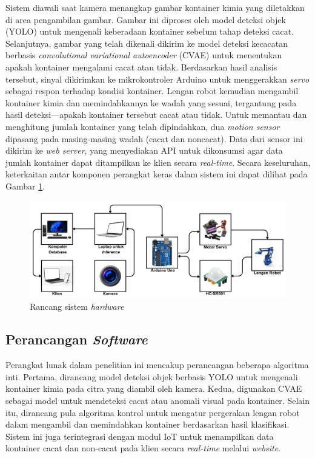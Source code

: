 Sistem diawali saat kamera menangkap gambar kontainer kimia yang
diletakkan di area pengambilan gambar. Gambar ini diproses oleh model
deteksi objek (YOLO) untuk mengenali keberadaan kontainer sebelum
tahap deteksi cacat. Selanjutnya, gambar yang telah dikenali dikirim
ke model deteksi kecacatan berbasis \textit{convolutional variational
autoencoder} (CVAE) untuk
menentukan apakah kontainer mengalami cacat atau tidak. Berdasarkan
hasil analisis tersebut, sinyal dikirimkan ke mikrokontroler Arduino
untuk menggerakkan \textit{servo} sebagai respon terhadap kondisi kontainer.
Lengan robot kemudian mengambil kontainer kimia dan memindahkannya ke
wadah yang sesuai, tergantung pada hasil deteksi—apakah kontainer
tersebut cacat atau tidak. Untuk memantau dan menghitung jumlah
kontainer yang telah dipindahkan, dua \textit{motion sensor} dipasang pada
masing-masing wadah (cacat dan noncacat). Data dari sensor ini
dikirim ke \textit{web server}, yang menyediakan API untuk dikonsumsi agar
data jumlah kontainer dapat ditampilkan ke klien secara \textit{real-time}.
Secara keseluruhan, keterkaitan antar komponen perangkat keras dalam
sistem ini dapat dilihat pada Gambar \ref{fig:hardware}.

\begin{figure}[H]
  \centering
  \includegraphics[width=\textwidth]{gambar/rancang.png}
  \caption{Rancang sistem \textit{hardware}}
  \label{fig:hardware}
\end{figure}
\vspace{-1em}

\vspace{1em}

\subsection{Perancangan \textit{Software}}
Perangkat lunak dalam penelitian ini mencakup perancangan beberapa
algoritma inti. Pertama, dirancang model deteksi objek berbasis YOLO
untuk mengenali kontainer kimia pada citra yang diambil oleh kamera.
Kedua, digunakan CVAE sebagai model untuk
mendeteksi cacat atau anomali visual pada kontainer. Selain itu,
dirancang pula algoritma kontrol untuk mengatur pergerakan lengan
robot dalam mengambil dan memindahkan kontainer berdasarkan hasil
klasifikasi. Sistem ini juga terintegrasi dengan modul IoT untuk
menampilkan data kontainer cacat dan non-cacat pada klien secara
\textit{real-time} melalui \textit{website}. \par


